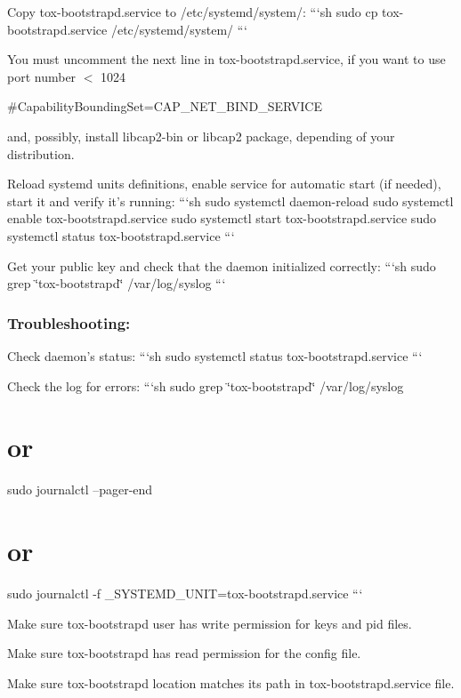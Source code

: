 Copy {\ttfamily tox-\/bootstrapd.\+service} to {\ttfamily /etc/systemd/system/}\+: ```sh sudo cp tox-\/bootstrapd.\+service /etc/systemd/system/ ```

You must uncomment the next line in tox-\/bootstrapd.\+service, if you want to use port number $<$ 1024 \begin{DoxyVerb}#CapabilityBoundingSet=CAP_NET_BIND_SERVICE
\end{DoxyVerb}


and, possibly, install {\ttfamily libcap2-\/bin} or {\ttfamily libcap2} package, depending of your distribution.

Reload systemd units definitions, enable service for automatic start (if needed), start it and verify it's running\+: ```sh sudo systemctl daemon-\/reload sudo systemctl enable tox-\/bootstrapd.\+service sudo systemctl start tox-\/bootstrapd.\+service sudo systemctl status tox-\/bootstrapd.\+service ```

Get your public key and check that the daemon initialized correctly\+: ```sh sudo grep \char`\"{}tox-\/bootstrapd\char`\"{} /var/log/syslog ```

\label{_systemd-troubleshooting}%
 \subsubsection*{Troubleshooting\+:}


\begin{DoxyItemize}
\item Check daemon's status\+: ```sh sudo systemctl status tox-\/bootstrapd.\+service ```
\item Check the log for errors\+: ```sh sudo grep \char`\"{}tox-\/bootstrapd\char`\"{} /var/log/syslog \section*{or}
\end{DoxyItemize}

sudo journalctl --pager-\/end \section*{or}

sudo journalctl -\/f \+\_\+\+S\+Y\+S\+T\+E\+M\+D\+\_\+\+U\+N\+I\+T=tox-\/bootstrapd.\+service ```


\begin{DoxyItemize}
\item Make sure tox-\/bootstrapd user has write permission for keys and pid files.
\item Make sure tox-\/bootstrapd has read permission for the config file.
\item Make sure tox-\/bootstrapd location matches its path in tox-\/bootstrapd.\+service file.
\end{DoxyItemize}

